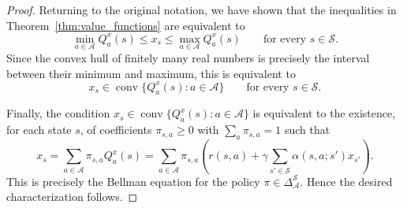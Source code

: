 \documentclass{article}
\theoremstyle{definition}
\theoremstyle{remark}
\begin{document}
\begin{proof}
Returning to the original notation, we have shown that the inequalities in Theorem~\ref{thm:value_functions} are equivalent to
\[
    \min_{a\in\mathcal A}Q_a^x(s)
    \le x_s\le
    \max_{a\in\mathcal A}Q_a^x(s)
    \qquad\text{for every }s\in\mathcal S.
\]
Since the convex hull of finitely many real numbers is precisely the interval between their minimum and maximum, this is equivalent to
\[
    x_s\in \operatorname{conv}\{Q_a^x(s):a\in\mathcal A\}
    \qquad\text{for every }s\in\mathcal S.
\]

Finally, the condition $x_s\in\operatorname{conv}\{Q_a^x(s):a\in\mathcal A\}$ is equivalent to the existence, for each state $s$, of coefficients $\pi_{s,a}\ge 0$ with $\sum_a\pi_{s,a}=1$ such that
\[
    x_s=\sum_{a\in\mathcal A}\pi_{s,a}Q_a^x(s) 
    =\sum_{a\in\mathcal A}\pi_{s,a} (r(s,a)+\gamma\sum_{s'\in\mathcal S}\alpha(s,a;s')x_{s'}) . 
\]
This is precisely the Bellman equation for the policy $\pi\in\Delta^{\mathcal S}_{\mathcal A}$. Hence the desired characterization follows. 
\end{proof}
\end{document}
